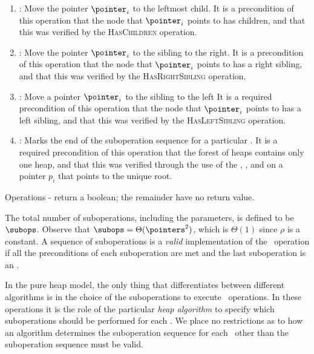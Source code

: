 \begin{fullonly}
\begin{enumerate}
\item {}: Move the pointer $\pointer_i$ to the leftmost child.
It is a precondition of this operation that the node that $\pointer_i$ points to has children, and that this was verified by the \textsc{HasChildren} operation.


\item {}: Move the pointer $\pointer_i$ to the sibling to the right.
It is a precondition of this operation that the node that $\pointer_i$ points to has a right sibling, and that this was verified by the \textsc{HasRightSibling} operation.


\item {}:  Move a pointer $\pointer_i$ to the sibling to the left
It is a required precondition of this operation that the node that $\pointer_i$ points to has a left sibling, and that this was verified by the \textsc{HasLeftSibling} operation.


\item {}:  Marks the end of the suboperation sequence for a particular \opEm.
It is a required precondition of this operation that the forest of heaps contains only one heap, and that this was verified through the use of the , , and  on a pointer $p_i$ that points to the unique root.

\end{enumerate}

Operations - return a boolean; the remainder have no return value.

\end{fullonly}
The total number of suboperations, including the parameters, is defined to be $\subops$. Observe that $\subops=\Theta(\pointers^2)$, which is $\Theta(1)$ since $\rho$ is a constant. 
A sequence of suboperations is a \emph{valid} implementation of the \opEm\ operation if all the preconditions of each suboperation are met and the last suboperation is an .




In the pure heap model, the only thing that differentiates between different algorithms is in the choice of the suboperations to execute \opEm\ operations. In these operations it is the role of the particular \emph{heap algorithm} to specify which suboperations should be performed for each \opEm. We place no restrictions as to how an algorithm determines the suboperation sequence for each \opEm\ other than the suboperation sequence must be valid.

